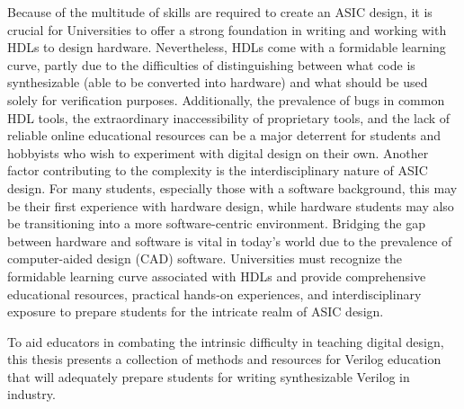 Because of the multitude of skills are required to create an ASIC design, it is crucial for Universities to offer a strong foundation in writing and working with HDLs to design hardware.
Nevertheless, HDLs come with a formidable learning curve, partly due to the difficulties of distinguishing between what code is synthesizable (able to be converted into hardware) and what should be used solely for verification purposes.
Additionally, the prevalence of bugs in common HDL tools, the extraordinary inaccessibility of proprietary tools, and the lack of reliable online educational resources can be a major deterrent for students and hobbyists who wish to experiment with digital design on their own.
Another factor contributing to the complexity is the interdisciplinary nature of ASIC design.
For many students, especially those with a software background, this may be their first experience with hardware design, while hardware students may also be transitioning into a more software-centric environment.
Bridging the gap between hardware and software is vital in today's world due to the prevalence of computer-aided design (CAD) software.
Universities must recognize the formidable learning curve associated with HDLs and provide comprehensive educational resources, practical hands-on experiences, and interdisciplinary exposure to prepare students for the intricate realm of ASIC design.

To aid educators in combating the intrinsic difficulty in teaching digital design, this thesis presents a collection of methods and resources for Verilog education that will adequately prepare students for writing synthesizable Verilog in industry.

